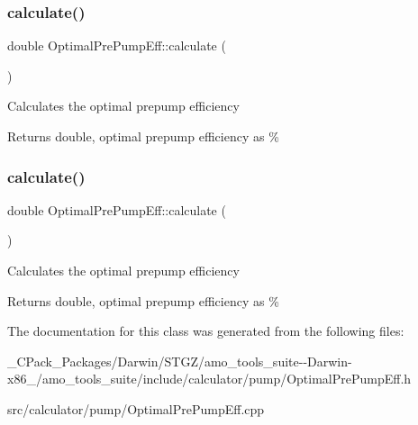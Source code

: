 \subsubsection{\texorpdfstring{calculate()}{calculate()}\hspace{0.1cm}{\footnotesize\ttfamily [2/3]}}
{\footnotesize\ttfamily double Optimal\+Pre\+Pump\+Eff\+::calculate (\begin{DoxyParamCaption}{ }\end{DoxyParamCaption})}

Calculates the optimal prepump efficiency \begin{DoxyReturn}{Returns}
double, optimal prepump efficiency as \% 
\end{DoxyReturn}
\mbox{\label{class_optimal_pre_pump_eff_a7ced63984a89975c4f8f54642701d841}} 
\subsubsection{\texorpdfstring{calculate()}{calculate()}\hspace{0.1cm}{\footnotesize\ttfamily [3/3]}}
{\footnotesize\ttfamily double Optimal\+Pre\+Pump\+Eff\+::calculate (\begin{DoxyParamCaption}{ }\end{DoxyParamCaption})}

Calculates the optimal prepump efficiency \begin{DoxyReturn}{Returns}
double, optimal prepump efficiency as \% 
\end{DoxyReturn}


The documentation for this class was generated from the following files\+:\begin{DoxyCompactItemize}
\item 
\+\_\+\+C\+Pack\+\_\+\+Packages/\+Darwin/\+S\+T\+G\+Z/amo\+\_\+tools\+\_\+suite-\/-\/\+Darwin-\/x86\+\_/amo\+\_\+tools\+\_\+suite/include/calculator/pump/Optimal\+Pre\+Pump\+Eff.\+h\item 
src/calculator/pump/Optimal\+Pre\+Pump\+Eff.\+cpp\end{DoxyCompactItemize}
